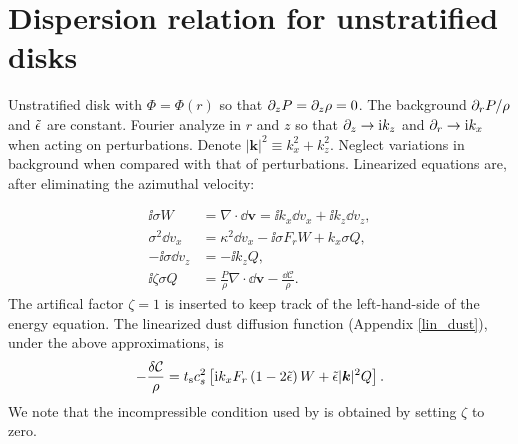 \section{Dispersion relation for unstratified disks}\label{compressible_streaming}
Unstratified disk with $\Phi = \Phi (r)$ so that $\partial_zP = \partial_z\rho =
0$. The background $\partial_rP/\rho$ and $\tilde{\epsilon}$ are constant. 
Fourier analyze in $r$ and $z$ so that $\partial_z\to \mathrm{i} k_z$ and
$\partial_r\to \mathrm{i} k_x$ when acting on perturbations. Denote $|\bm{k}|^2
\equiv k_x^2 + k_z^2$. Neglect variations in
background when compared with that of perturbations. Linearized
equations are, after eliminating the azimuthal velocity: 

\begin{align}
  \ii \sigma W &=\nabla\cdot \bm{\dd v} = \ii k_x \dd v_x + \ii k_z \dd v_z,\\
    \sigma^2 \dd v_x &= \kappa^2 \dd v_x - \ii \sigma F_r W +
    k_x\sigma Q,\\
  -\ii\sigma\dd v_z &= -\ii k_zQ,\\
\ii \zeta \sigma  Q & = \frac{P}{\rho} \nabla \cdot \bm{\dd v}   -
  \frac{\dd \mathcal{C}}{\rho}. 
\end{align}
The artifical factor $\zeta = 1$  is inserted to keep track of the
left-hand-side of the energy equation. The linearized dust diffusion
function (Appendix \ref{lin_dust}), 
under the above approximations, is 
\begin{align}
-\frac{\delta \mathcal{C}}{\rho}  = t_\mathrm{s} c_s^2 \left[\mathrm{i} k_x F_r\left( 1-2\tilde{\epsilon}\right)
  W + \tilde{\epsilon} |\bm{k}|^2 Q\right]. 
\end{align}
We note that the incompressible condition used by \cite{jacquet11} is
obtained by setting $\zeta$ to zero. 

